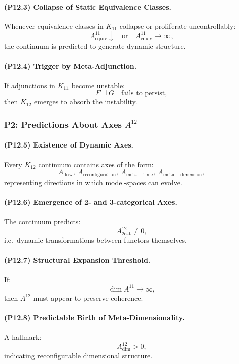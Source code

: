 \paragraph{(P12.3) Collapse of Static Equivalence Classes.}
Whenever equivalence classes in $K_{11}$ collapse or proliferate uncontrollably:
\[
A_{\mathrm{equiv}}^{11} \downarrow \quad \text{or}\quad 
A_{\mathrm{equiv}}^{11} \to \infty,
\]
the continuum is predicted to generate dynamic structure.

\paragraph{(P12.4) Trigger by Meta-Adjunction.}
If adjunctions in $K_{11}$ become unstable:
\[
F \dashv G \quad\text{fails to persist},
\]
then $K_{12}$ emerges to absorb the instability.

\subsubsection{P2: Predictions About Axes $A^{12}$}

\paragraph{(P12.5) Existence of Dynamic Axes.}
Every $K_{12}$ continuum contains axes of the form:
\[
A_{\mathrm{flow}},\ A_{\mathrm{reconfiguration}},\ 
A_{\mathrm{meta-time}},\ A_{\mathrm{meta-dimension}},
\]
representing directions in which model-spaces can evolve.

\paragraph{(P12.6) Emergence of 2- and 3-categorical Axes.}
The continuum predicts:
\[
A_{\mathrm{2cat}}^{12} \neq 0,
\]
i.e.\ dynamic transformations between functors themselves.

\paragraph{(P12.7) Structural Expansion Threshold.}
If:
\[
\dim A^{11} \to \infty,
\]
then $A^{12}$ must appear to preserve coherence.

\paragraph{(P12.8) Predictable Birth of Meta-Dimensionality.}
A hallmark:
\[
A_{\mathrm{dim}}^{12} > 0,
\]
indicating reconfigurable dimensional structure.

